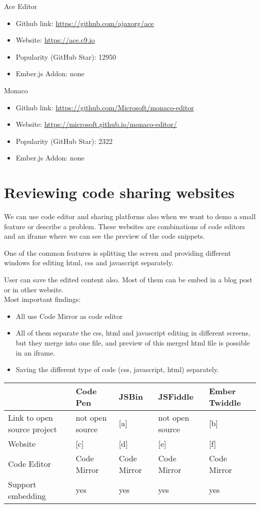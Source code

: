 \documentclass[11pt, a4paper, twoside, openright]{report}
\begin{document}
\noindent Ace Editor
\begin{itemize}[noitemsep]
\item Github link: \url{https://github.com/ajaxorg/ace}
\item Website: \url{https://ace.c9.io}
\item Popularity (GitHub Star): 12950
\item Ember.js Addon: none
\end{itemize}

\noindent Monaco
\begin{itemize}[noitemsep]
\item Github link: \url{https://github.com/Microsoft/monaco-editor}
\item Website: \url{https://microsoft.github.io/monaco-editor/}
\item Popularity (GitHub Star): 2322
\item Ember.js Addon: none
\end{itemize}

\section{Reviewing code sharing websites}

We can use code editor and sharing platforms also when we want to demo a small feature or describe a problem. These websites are combinations of code editors and an iframe where we can see the preview of the code snippets.

One of the common features is splitting the screen and providing different windows for editing html, css and javascript separately.

User can save the edited content also. Most of them can be embed in a blog post or in other website. \\

\noindent Most important findings:
\begin{itemize}[noitemsep]
\item All use Code Mirror as code editor
\item All of them separate the css, html and javascript editing in different screens, but they merge into one file, and preview of this merged html file is possible in an iframe.
\item Saving the different type of code (css, javascript, html) separately.
\end{itemize}

\newpage

\begin{tabular}{|l|l|l|l|l|}
\hline
& Code Pen & JSBin & JSFiddle & Ember Twiddle \\
\hline
Link to open source project & not open source & [a] & not open source & [b]  \\
\hline
Website & [c] & [d] & [e] & [f] \\
\hline
Code Editor & Code Mirror & Code Mirror & Code Mirror & Code Mirror \\
\hline
Support embedding & yes & yes & yes & yes \\
\hline
\end{tabular}\\
\end{document}
